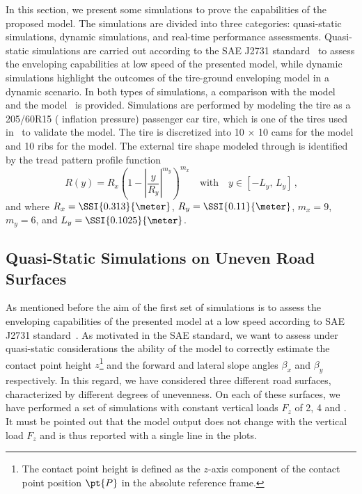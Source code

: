 In this section, we present some simulations to prove the capabilities of the proposed model. The simulations are divided into three categories: quasi-static simulations, dynamic simulations, and real-time performance assessments. Quasi-static simulations are carried out according to the SAE J2731 standard~\cite{saej2731} to assess the enveloping capabilities at low speed of the presented model, while dynamic simulations highlight the outcomes of the tire-ground enveloping model in a dynamic scenario. In both types of simulations, a comparison with the \Swift{} model~\cite{schmeitz2004semiempirical} and the \TMEasy{} model~\cite{rill2018sophisticated} is provided. Simulations are performed by modeling the tire as a 205/60R15 ( inflation pressure) passenger car tire, which is one of the tires used in~\cite{schmeitz2004semiempirical} to validate the \Swift{} model. The tire is discretized into 10 $\times$ 10 cams for the \Swift{} model and 10 ribs for the \Enve{} model. The external tire shape modeled through \Enve{} is identified by the tread pattern profile function
%
\begin{equation*}
  R(y) = R_{x} \left(1 - \left| \dfrac{y}{R_{y}} \right|^{m_y}\right)^{m_x} \quad \text{with} \quad y \in [-L_{y}, \, L_{y}] \,\text{,}
\end{equation*}
%
and where $R_{x} = \SSI{0.313}{\meter}$, $R_{y} = \SSI{0.11}{\meter}$, $m_x = 9$, $m_y = 6$, and $L_{y} = \SSI{0.1025}{\meter}$.

\subsection{Quasi-Static Simulations on Uneven Road Surfaces}
\label{chap3:Enveloping}

As mentioned before the aim of the first set of simulations is to assess the enveloping capabilities of the presented model at a low speed according to SAE J2731 standard~\cite{saej2731}. As motivated in the SAE standard, we want to assess under quasi-static considerations the ability of the model to correctly estimate the contact point height $z$\footnote{The contact point height is defined as the $z$-axis component of the contact point position $\pt{P}$ in the absolute reference frame.} and the forward and lateral slope angles $\beta_x$ and $\beta_y$ respectively. In this regard, we have considered three different road surfaces, characterized by different degrees of unevenness. On each of these surfaces, we have performed a set of simulations with constant vertical loads $F_z$ of 2, 4 and . It must be pointed out that the \TMEasy{} model output does not change with the vertical load $F_z$ and is thus reported with a single line in the plots.

